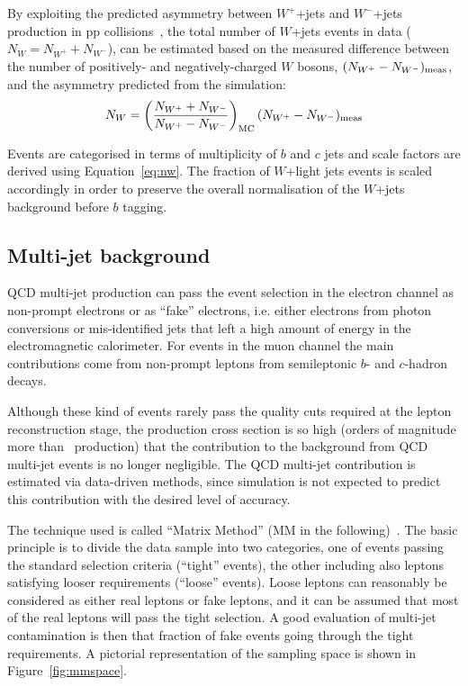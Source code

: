 By exploiting the predicted asymmetry between
$W^+$+jets and $W^-$+jets production in pp collisions~\cite{wasym},
the total number of $W$+jets events in data ($N_W=N_{W^+}+N_{W^-}$), 
can be estimated based on the measured
difference between the number of positively- and negatively-charged $W$
bosons, $(N_{W^+}-N_{W^-})_{\rm meas}$, and the asymmetry predicted from the simulation:
\begin{equation}
N_W = \left(\frac{N_{W^+}+N_{W^-}}{N_{W^+}-N_{W^-}}\right )_{\rm MC}(N_{W^+}-N_{W^-})_{\rm meas}
\label{eq:nw}
\end{equation}

Events are categorised in terms of  multiplicity of $b$ and $c$ jets and scale factors are
derived using Equation~\ref{eq:nw}.
The fraction of $W$+light jets events is scaled accordingly
in order to preserve the overall normalisation of the $W$+jets background before $b$ tagging.




\subsection{Multi-jet background}\label{sec:qcdbkg}

QCD multi-jet production can pass the event selection in the electron
channel as non-prompt electrons or as ``fake'' electrons, i.e.
either electrons from photon conversions or mis-identified jets
that left a high amount of energy in the electromagnetic calorimeter.
For events in the muon channel the main contributions come from
non-prompt leptons from semileptonic $b$- and $c$-hadron decays.

Although these kind of events rarely pass the quality cuts 
required at the lepton reconstruction stage, the production cross section
is so high (orders  of magnitude more than \ttbar\ production)
that the contribution to the background from QCD multi-jet events is
no longer negligible. The QCD multi-jet contribution
is estimated via data-driven 
methods, since simulation is not expected to predict this contribution
with the desired level of accuracy.

The technique used is called ``Matrix Method'' (MM in the following)~\cite{ttbar_3pb}.  
The basic principle is to divide the data sample into two categories, one
of events passing the standard selection criteria (``tight'' events), the
other including also leptons satisfying looser requirements (``loose'' events).
Loose leptons can reasonably  be considered as either real leptons or fake leptons,
and it can be assumed that most of the real leptons will pass the tight selection. 
A good evaluation of multi-jet contamination is then that fraction of fake events going
through the tight requirements. A pictorial representation of the sampling space 
is shown in Figure~\ref{fig:mmspace}.

